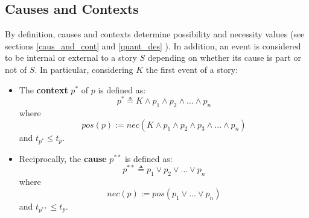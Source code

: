 \documentclass[
		twoside,openright,titlepage,numbers=noenddot,manychapters,
		headinclude,%
                footinclude=false,cleardoublepage=empty,
                BCOR=5mm,
		fontsize=11pt, %
                 enabledeprecatedfontcommands]{scrreprt}
\begin{document}






\subsection{Causes and Contexts}
	
By definition, causes and contexts determine possibility and necessity values (see sections \ref{caus_and_cont} and \ref{quant_des}%
). In addition, an event is considered to be internal or external to a story $S$ depending on whether its cause is part or not of $S$. In particular, considering $K$ the first event of a story:

\begin{itemize}
	 \item The \textbf{context} $p^*$ of $p$ is defined as:
\begin{equation*}p^* \triangleq K\wedge p_1 \wedge p_2 \wedge...\wedge p_n
\end{equation*}
 where 
\begin{equation*}pos(p):= nec(K \wedge p_1 \wedge p_2 \wedge p_3 \wedge ...\wedge p_n) \end{equation*} 
and $t_{p^*} \leq t_p$.
  \item  Reciprocally, the \textbf{cause} $p^{**}$ is defined as:
\begin{equation*}p^{**} \triangleq p_1 \vee p_2 \vee ... \vee p_n 
\end{equation*}
 where
\begin{equation*} nec(p):= pos (p_{1} \vee ... \vee p_{n})\end{equation*}
 and  $t_{p^{**}} \leq t_p$. 
\end{itemize}
\end{document}
